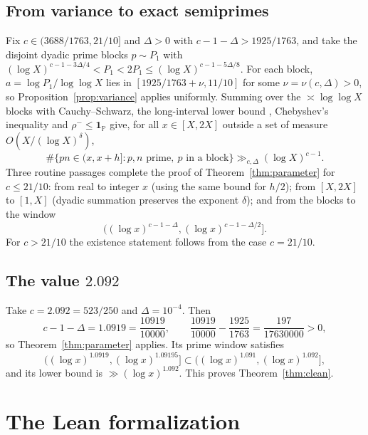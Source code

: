 \documentclass[11pt,a4paper]{amsart}
\theoremstyle{definition}
\newcommand{\1}{\mathbf 1}
\begin{document}
\subsection{From variance to exact semiprimes}

Fix \(c\in(3688/1763,21/10]\) and \(\Delta>0\) with
\(c-1-\Delta>1925/1763\), and take the disjoint dyadic prime blocks
\(p\sim P_1\) with
\((\log X)^{c-1-3\Delta/4}<P_1<2P_1\le(\log X)^{c-1-5\Delta/8}\).
For each block, \(a=\log P_1/\log\log X\) lies in
\([1925/1763+\nu,11/10]\) for some \(\nu=\nu(c,\Delta)>0\), so
Proposition~\ref{prop:variance} applies uniformly.  Summing over the
\(\asymp\log\log X\) blocks with Cauchy--Schwarz, the long-interval lower
bound \cite[Theorem~2.1(ii)]{MT}, Chebyshev's inequality and
\(\rho^-\le\1_{\mathbb P}\) give, for all \(x\in[X,2X]\) outside a set of
measure \(O(X/(\log X)^\delta)\),
\[
 \#\{pn\in(x,x+h]:p,n\text{ prime},\ p\text{ in a block}\}
 \gg_{c,\Delta}(\log X)^{c-1}.
\]
Three routine passages complete the proof of Theorem~\ref{thm:parameter}
for \(c\le21/10\): from real to integer \(x\) (using the same bound for
\(h/2\)); from \([X,2X]\) to \([1,X]\) (dyadic summation preserves the
exponent \(\delta\)); and from the blocks to the window
\[
 \bigl((\log x)^{c-1-\Delta},(\log x)^{c-1-\Delta/2}\bigr].
\]
For \(c>21/10\) the existence statement follows from the case
\(c=21/10\).

\subsection{The value \texorpdfstring{\(2.092\)}{2.092}}
Take \(c=2.092=523/250\) and \(\Delta=10^{-4}\).  Then
\[
 c-1-\Delta=1.0919=\frac{10919}{10000},\qquad
 \frac{10919}{10000}-\frac{1925}{1763}=\frac{197}{17630000}>0,
\]
so Theorem~\ref{thm:parameter} applies.  Its prime window satisfies
\[
 \bigl((\log x)^{1.0919},(\log x)^{1.09195}\bigr]
 \subset\bigl((\log x)^{1.091},(\log x)^{1.092}\bigr],
\]
and its lower bound is \(\gg(\log x)^{1.092}\).  This proves
Theorem~\ref{thm:clean}.

\section{The Lean formalization}\label{sec:lean}
\end{document}
